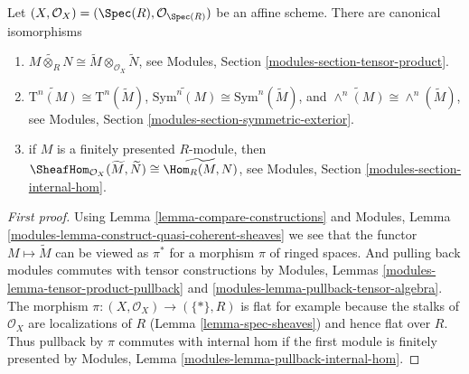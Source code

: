 \begin{lemma}
\label{lemma-widetilde-constructions}
Let $(X, \mathcal{O}_X) = (\Spec(R), \mathcal{O}_{\Spec(R)})$
be an affine scheme. There are canonical isomorphisms
\begin{enumerate}
\item
$
\widetilde{M \otimes_R N}
\cong
\widetilde M \otimes_{\mathcal{O}_X} \widetilde N
$,
see Modules, Section \ref{modules-section-tensor-product}.
\item
$
\widetilde{\text{T}^n(M)}
\cong
\text{T}^n(\widetilde M)
$,
$
\widetilde{\text{Sym}^n(M)}
\cong
\text{Sym}^n(\widetilde M)
$, and
$
\widetilde{\wedge^n(M)}
\cong
\wedge^n(\widetilde M)
$,
see
Modules, Section \ref{modules-section-symmetric-exterior}.
\item if $M$ is a finitely presented $R$-module, then
$
\SheafHom_{\mathcal{O}_X}(\widetilde M, \widetilde N)
\cong
\widetilde{\Hom_R(M,  N)}
$,
see
Modules, Section \ref{modules-section-internal-hom}.
\end{enumerate}
\end{lemma}

\begin{proof}[First proof]
Using Lemma \ref{lemma-compare-constructions} and
Modules, Lemma \ref{modules-lemma-construct-quasi-coherent-sheaves}
we see that the functor $M \mapsto \widetilde M$ can be viewed
as $\pi^*$ for a morphism $\pi$ of ringed spaces.
And pulling back modules commutes with tensor constructions by
Modules, Lemmas \ref{modules-lemma-tensor-product-pullback}
and \ref{modules-lemma-pullback-tensor-algebra}.
The morphism $\pi : (X, \mathcal{O}_X) \to (\{*\}, R)$ is
flat for example because the stalks of $\mathcal{O}_X$ are
localizations of $R$ (Lemma \ref{lemma-spec-sheaves})
and hence flat over $R$. Thus pullback by $\pi$ commutes
with internal hom if the first module is finitely presented by
Modules, Lemma \ref{modules-lemma-pullback-internal-hom}.
\end{proof}

